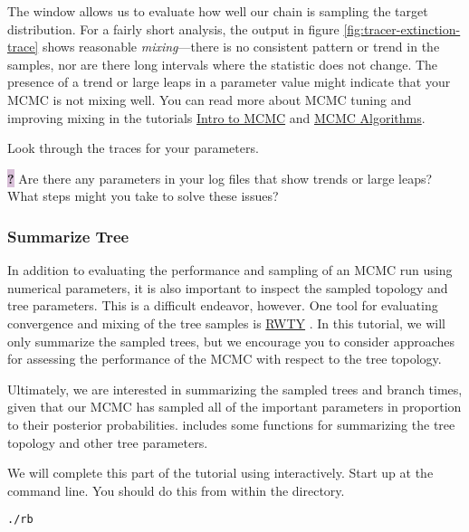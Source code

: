 The  window allows us to evaluate how well our chain is sampling the target distribution.
For a fairly short analysis, the output in figure \ref{fig:tracer-extinction-trace} shows reasonable \textit{mixing}---there is no consistent pattern or trend in the samples, nor are there long intervals where the statistic does not change.
The presence of a trend or large leaps in a parameter value might indicate that your MCMC is not mixing well.
You can read more about MCMC tuning and improving mixing in the tutorials \href{https://github.com/revbayes/revbayes_tutorial/raw/master/tutorial_TeX/RB_MCMC_Intro_Tutorial/RB_MCMC_Intro_Tutorial.pdf}{Intro to MCMC} and \href{https://github.com/revbayes/revbayes_tutorial/raw/master/tutorial_TeX/RB_MCMC_Tutorial/RB_MCMC_Tutorial.pdf}{MCMC Algorithms}.

\begin{framed}
Look through the traces for your parameters. 

\colorbox{Thistle}{\bf ?} Are there any parameters in your log files that show trends or large leaps? What steps might you take to solve these issues?
\end{framed}

\medskip
\subsubsection{Summarize Tree}\label{subsub:Exercise-SummarizeTree}


In addition to evaluating the performance and sampling of an MCMC run using numerical parameters, it is also important to inspect the sampled topology and tree parameters. 
This is a difficult endeavor, however. 
One tool for evaluating convergence and mixing of the tree samples is \href{https://github.com/danlwarren/RWTY}{RWTY} \citep{Warren2016}. 
In this tutorial, we will only summarize the sampled trees, but we encourage you to consider approaches for assessing the performance of the MCMC with respect to the tree topology.

Ultimately, we are interested in summarizing the sampled trees and branch times, given that our MCMC has sampled all of the important parameters in proportion to their posterior probabilities. 
\RevBayes includes some functions for summarizing the tree topology and other tree parameters.

We will complete this part of the tutorial using \RevBayes interactively.
Start up \RevBayes at the command line.
You should do this from within the  directory.
{\tt \begin{snugshade*}
\begin{lstlisting}
./rb
\end{lstlisting}
\end{snugshade*}}

